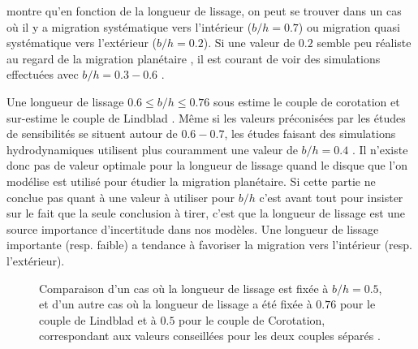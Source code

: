  montre qu'en fonction de la longueur de lissage, on peut se trouver dans un cas où il y a
migration systématique vers l'intérieur ($b/h=0.7$) ou migration quasi systématique vers l'extérieur ($b/h=0.2$). Si une valeur
de $0.2$ semble peu réaliste au regard de la migration planétaire \citep{muller2012treating}, il est courant de voir des
simulations effectuées avec $b/h=0.3-0.6$ \citep{masset2002coorbital, devalborro2006comparative, paardekooper2009corotation}. 

Une longueur de lissage $0.6 \leqslant b/h \leqslant 0.76$ sous estime le couple de corotation et sur-estime le couple de
Lindblad \citep{masset2002coorbital}. Même si les valeurs préconisées par les études de sensibilités se situent autour de
$0.6-0.7$, les études faisant des simulations hydrodynamiques utilisent plus couramment une valeur de $b/h=0.4$
\citep{paardekooper2011torque}. Il n'existe donc pas de valeur optimale pour la longueur de lissage quand le disque que l'on
modélise est utilisé pour étudier la migration planétaire. Si cette partie ne conclue pas quant à une valeur à utiliser pour
$b/h$ c'est avant tout pour insister sur le fait que la seule conclusion à tirer, c'est que la longueur de lissage est une
source importance d'incertitude dans nos modèles. Une longueur de lissage importante (resp. faible) a tendance à favoriser la
migration vers l'intérieur (resp. l'extérieur). 

\begin{figure}[htbp]
\centering
{}\hfill
{}
\caption[Comparaison entre une simple ou double longueur de lissage.]{Comparaison d'un cas où la longueur de lissage
est fixée à $b/h=0.5$, et d'un autre cas où la longueur de lissage a été
fixée à $0.76$ pour le couple de Lindblad et à $0.5$ pour le couple de Corotation, correspondant aux valeurs conseillées pour
les deux couples séparés \citep{masset2002coorbital}. }\label{fig:modified_smoothing}
\end{figure}

